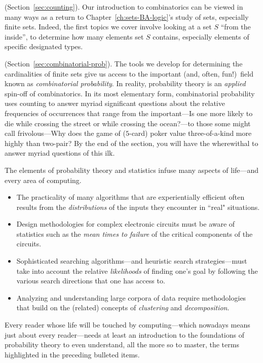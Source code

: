\medskip


 (Section~\ref{sec:counting}).
Our introduction to combinatorics can be viewed in many ways as a return to Chapter~\ref{ch:sets-BA-logic}'s study of sets, especially finite sets.  Indeed, the first topics we cover involve looking at a set $S$ ``from the inside'', to determine how many elements set $S$ contains, especially elements of specific designated types.

\medskip

 
 

 (Section~\ref{sec:combinatorial-prob}).
The tools we develop for determining the cardinalities of finite sets give us access to the important (and, often, fun!)~field known as {\em combinatorial probability}. In reality, probability theory is an {\em applied} spin-off of combinatorics.  In its most elementary form, combinatorial probability uses counting to answer myriad significant questions about the relative frequencies of occurrences that range from the important---Is one more likely to die while crossing the street or while crossing the ocean?---to those some might call frivolous---Why does the game of ($5$-card) poker value three-of-a-kind more highly than two-pair?  By the end of the section, you will have the wherewithal to answer myriad questions of this ilk.

The elements of probability theory and statistics infuse many aspects of life---and every area of computing.
\begin{itemize}
\item
The practicality of many algorithms that are experientially efficient often results from the {\em distributions} of the inputs they encounter in ``real" situations.
\medskip\item
Design methodologies for complex electronic circuits must be aware of statistics such as the {\em mean times to failure} of the critical components of the circuits.
\medskip\item
Sophisticated searching algorithms---and heuristic search strategies---must take into account the relative
{\em likelihoods} of finding one's goal by following the various search directions that one has access to.
\medskip\item
Analyzing and understanding large corpora of data require methodologies that build on the (related) concepts of {\em clustering} and {\em decomposition}.
\end{itemize}
Every reader whose life will be touched by computing---which nowadays means just about every reader---needs at least an introduction to the foundations of probability theory to even understand, all the more so to master, the terms highlighted in the preceding bulleted items.

